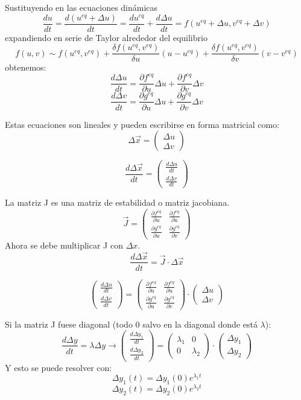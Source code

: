 Sustituyendo en las ecuaciones dinámicas
$$\frac{du}{dt} = \frac{d(u^{eq} + \Delta u)}{dt} = \frac{du^{eq}}{dt} + \frac{d \Delta u}{dt} = f(u^{eq} + \Delta u, v^{eq} + \Delta v)$$
expandiendo en serie de Taylor alrededor del equilibrio
$$f(u, v) \sim f(u^{eq}, v^{eq}) + \frac{\delta f(u^{eq}, v^{eq})}{\delta u}(u - u^{eq}) + \frac{\delta f(u^{eq}, v^{eq})}{\delta v}(v - v^{eq})$$
obtenemos:
$$\frac{d \Delta u}{dt} = \frac{\partial f^{eq}}{\partial u} \Delta u + \frac{\partial f^{eq}}{\partial v} \Delta v$$
$$\frac{d \Delta v}{dt} = \frac{\partial g^{eq}}{\partial u} \Delta u + \frac{\partial g^{eq}}{\partial v} \Delta v$$

Estas ecuaciones son lineales y pueden escribirse en forma matricial como:
$$\Delta \vec{x} = \begin{pmatrix}
\Delta u \\ \Delta v
\end{pmatrix} $$

$$\frac{d \Delta \vec{x}}{dt} = \begin{pmatrix}
\frac{d \Delta u}{dt} \\ \frac{d \Delta v}{dt}
\end{pmatrix}$$

La matriz J es una matriz de estabilidad o matriz jacobiana.
$$\vec{J} = \begin{pmatrix}
\frac{\partial f^{eq}}{\partial u} & \frac{\partial f^{eq}}{\partial u} \\
\frac{\partial g^{eq}}{\partial u} & \frac{\partial g^{eq}}{\partial v}
\end{pmatrix}$$
Ahora se debe multiplicar J con $\Delta x$.
$$\frac{d \Delta \vec{x}}{dt} = \vec{J} \cdot \Delta \vec{x}$$

$$\begin{pmatrix}
\frac{d \Delta u}{dt} \\ \frac{d \Delta v}{dt}
\end{pmatrix} = \begin{pmatrix}
\frac{\partial f^{eq}}{\partial u} & \frac{\partial f^{eq}}{\partial u} \\
\frac{\partial g^{eq}}{\partial u} & \frac{\partial g^{eq}}{\partial v}
\end{pmatrix} \cdot \begin{pmatrix}
\Delta u \\ \Delta v
\end{pmatrix}$$

Si la matriz J fuese diagonal (todo 0 salvo en la diagonal donde está $\lambda$):
$$\frac{d \Delta y}{dt} = \lambda \Delta y \rightarrow \begin{pmatrix}
\frac{d \Delta y_1}{dt} \\ \frac{d \Delta y_2}{dt}
\end{pmatrix} = \begin{pmatrix}
\lambda_1 & 0 \\ 0 & \lambda_2
\end{pmatrix} \cdot \begin{pmatrix}
\Delta y_1 \\ \Delta y_2
\end{pmatrix}$$
Y esto se puede resolver con:
$$\Delta y_1 (t) = \Delta y_1 (0) e^{\lambda_1 t}$$
$$\Delta y_2 (t) = \Delta y_2 (0) e^{\lambda_2 t}$$

